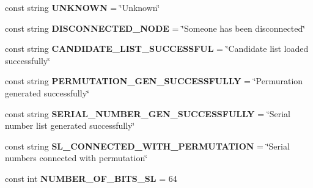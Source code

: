\begin{DoxyCompactItemize}
\item 
\hypertarget{class_election_authority_1_1_constants_adabf1df04f349b967455b9516e5d5d05}{}const string {\bfseries U\+N\+K\+N\+O\+W\+N} = \char`\"{}Unknown\char`\"{}\label{class_election_authority_1_1_constants_adabf1df04f349b967455b9516e5d5d05}

\item 
\hypertarget{class_election_authority_1_1_constants_af1f1f5dfffb44c80db736ebd95e06f45}{}const string {\bfseries D\+I\+S\+C\+O\+N\+N\+E\+C\+T\+E\+D\+\_\+\+N\+O\+D\+E} = \char`\"{}Someone has been disconnected\char`\"{}\label{class_election_authority_1_1_constants_af1f1f5dfffb44c80db736ebd95e06f45}

\item 
\hypertarget{class_election_authority_1_1_constants_a3443667b831e187da3aa6753b5573b09}{}const string {\bfseries C\+A\+N\+D\+I\+D\+A\+T\+E\+\_\+\+L\+I\+S\+T\+\_\+\+S\+U\+C\+C\+E\+S\+S\+F\+U\+L} = \char`\"{}Candidate list loaded successfully\char`\"{}\label{class_election_authority_1_1_constants_a3443667b831e187da3aa6753b5573b09}

\item 
\hypertarget{class_election_authority_1_1_constants_ad320f14b6a61bfa0453fed63edc838f9}{}const string {\bfseries P\+E\+R\+M\+U\+T\+A\+T\+I\+O\+N\+\_\+\+G\+E\+N\+\_\+\+S\+U\+C\+C\+E\+S\+S\+F\+U\+L\+L\+Y} = \char`\"{}Permuration generated successfully\char`\"{}\label{class_election_authority_1_1_constants_ad320f14b6a61bfa0453fed63edc838f9}

\item 
\hypertarget{class_election_authority_1_1_constants_a21e0559abddd3774ff20f69de0c5a549}{}const string {\bfseries S\+E\+R\+I\+A\+L\+\_\+\+N\+U\+M\+B\+E\+R\+\_\+\+G\+E\+N\+\_\+\+S\+U\+C\+C\+E\+S\+S\+F\+U\+L\+L\+Y} = \char`\"{}Serial number list generated successfully\char`\"{}\label{class_election_authority_1_1_constants_a21e0559abddd3774ff20f69de0c5a549}

\item 
\hypertarget{class_election_authority_1_1_constants_abb781de9ffb55e466656b49a850a4b43}{}const string {\bfseries S\+L\+\_\+\+C\+O\+N\+N\+E\+C\+T\+E\+D\+\_\+\+W\+I\+T\+H\+\_\+\+P\+E\+R\+M\+U\+T\+A\+T\+I\+O\+N} = \char`\"{}Serial numbers connected with permutation\char`\"{}\label{class_election_authority_1_1_constants_abb781de9ffb55e466656b49a850a4b43}

\item 
\hypertarget{class_election_authority_1_1_constants_a00f65992a14512d2399946eb9af7e2b0}{}const int {\bfseries N\+U\+M\+B\+E\+R\+\_\+\+O\+F\+\_\+\+B\+I\+T\+S\+\_\+\+S\+L} = 64\label{class_election_authority_1_1_constants_a00f65992a14512d2399946eb9af7e2b0}


\end{DoxyCompactItemize}
